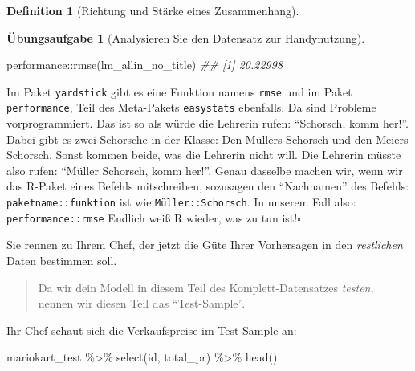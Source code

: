 \documentclass[
  a4paper,
  DIV=11]{scrreprt}
\newenvironment{Shaded}{\begin{snugshade}}{\end{snugshade}}
\newcommand{\DocumentationTok}[1]{\textcolor[rgb]{0.37,0.37,0.37}{\textit{#1}}}
\newcommand{\FunctionTok}[1]{\textcolor[rgb]{0.28,0.35,0.67}{#1}}
\newcommand{\NormalTok}[1]{\textcolor[rgb]{0.00,0.23,0.31}{#1}}
\newcommand{\SpecialCharTok}[1]{\textcolor[rgb]{0.37,0.37,0.37}{#1}}
\theoremstyle{definition}
\newtheorem{exercise}{Übungsaufgabe}[chapter]
\theoremstyle{definition}
\theoremstyle{definition}
\newtheorem{definition}{Definition}[chapter]
\theoremstyle{remark}
\begin{document}
\begin{definition}[Richtung und Stärke eines
Zusammenhang]
\begin{exercise}[Analysieren Sie den Datensatz zur
Handynutzung]
\begin{Shaded}
\begin{Highlighting}[]
\NormalTok{performance}\SpecialCharTok{::}\FunctionTok{rmse}\NormalTok{(lm\_allin\_no\_title)}
\DocumentationTok{\#\# [1] 20.22998}
\end{Highlighting}
\end{Shaded}

\begin{tcolorbox}[enhanced jigsaw, leftrule=.75mm, opacitybacktitle=0.6, colback=white, colframe=quarto-callout-caution-color-frame, coltitle=black, colbacktitle=quarto-callout-caution-color!10!white, opacityback=0, left=2mm, breakable, titlerule=0mm, toptitle=1mm, bottomtitle=1mm, rightrule=.15mm, title=\textcolor{quarto-callout-caution-color}{\faFire}\hspace{0.5em}{Name Clash}, arc=.35mm, bottomrule=.15mm, toprule=.15mm]

Im Paket \texttt{yardstick} gibt es eine Funktion namens \texttt{rmse}
und im Paket \texttt{performance}, Teil des Meta-Pakets
\texttt{easystats} ebenfalls. Da sind Probleme vorprogrammiert. Das ist
so als würde die Lehrerin rufen: ``Schorsch, komm her!''. Dabei gibt es
zwei Schorsche in der Klasse: Den Müllers Schorsch und den Meiers
Schorsch. Sonst kommen beide, was die Lehrerin nicht will. Die Lehrerin
müsste also rufen: ``Müller Schorsch, komm her!''. Genau dasselbe machen
wir, wenn wir das R-Paket eines Befehls mitschreiben, sozusagen den
``Nachnamen'' des Befehls: \texttt{paketname::funktion} ist wie
\texttt{Müller::Schorsch}. In unserem Fall also:
\texttt{performance::rmse} Endlich weiß R wieder, was zu tun
ist!\(\square\)

\end{tcolorbox}

Sie rennen zu Ihrem Chef, der jetzt die Güte Ihrer Vorhersagen in den
\emph{restlichen} Daten bestimmen soll.

\begin{quote}
{} Da wir dein Modell in diesem Teil des
Komplett-Datensatzes \emph{testen}, nennen wir diesen Teil das
``Test-Sample''.
\end{quote}

Ihr Chef schaut sich die Verkaufspreise im Test-Sample an:

\begin{Shaded}
\begin{Highlighting}[]
\NormalTok{mariokart\_test }\SpecialCharTok{\%\textgreater{}\%} 
  \FunctionTok{select}\NormalTok{(id, total\_pr) }\SpecialCharTok{\%\textgreater{}\%} 
  \FunctionTok{head}\NormalTok{()}
\end{Highlighting}
\end{Shaded}


\end{exercise}
\end{definition}
\end{document}
